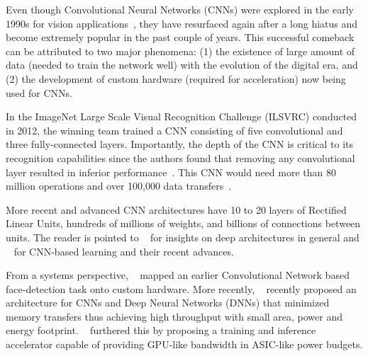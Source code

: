 Even though Convolutional Neural Networks (CNNs) were explored in the early 1990s for vision applications~\cite{giles1997}, they have resurfaced again after a long hiatus and become extremely popular in the past couple of years. 
This successful comeback can be attributed to two major phenomena:
(1) the existence of large amount of data (needed to train the network well) with the evolution of the digital era, and (2) the development of 
custom hardware (required for acceleration) now being used for CNNs. 

In the ImageNet Large Scale Visual Recognition Challenge (ILSVRC)
conducted in 2012, the winning team trained a CNN consisting of five convolutional and three fully-connected layers. Importantly, the depth of the CNN is critical to 
its recognition capabilities since the authors found that removing any convolutional layer resulted in inferior performance~\cite{NIPS2012}. This CNN would need
more than 80 million operations and over 100,000 data transfers~\cite{XilinxCNN}.

More recent and advanced CNN architectures have 10 to 20 layers of Rectified Linear Units, hundreds of millions of weights, and billions of connections between units.
The reader is pointed to ~\cite{Bengio2009} for insights on deep architectures in general and ~\cite{DNNNature2015} for CNN-based learning and their recent advances. 

From a systems perspective, ~\cite{Farabet2009} mapped an earlier Convolutional Network based face-detection task onto custom hardware. More recently, ~\cite{Chen2014} recently proposed an architecture for CNNs and Deep 
Neural Networks (DNNs) that minimized memory transfers thus achieving high
throughput with small area, power and energy footprint. ~\cite{DaDianNao} furthered this by proposing a training and inference accelerator 
capable of providing GPU-like bandwidth in ASIC-like power budgets.
